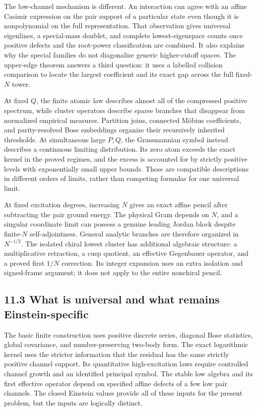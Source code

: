 The low-channel mechanism is different. An interaction can agree with an affine Casimir expression on the pair support of a particular state even though it is nonpolynomial on the full representation. That observation gives universal eigenlines, a special-mass doublet, and complete lowest-eigenspace counts once positive defects and the root-power classification are combined. It also explains why the special families do not diagonalize generic higher-cutoff spaces. The upper-edge theorem answers a third question: it uses a labelled collision comparison to locate the largest coefficient and its exact gap across the full fixed-\(N\) tower.

At fixed \(Q\), the finite atomic law describes almost all of the compressed positive spectrum, while cluster operators describe sparse branches that disappear from normalized empirical measures. Partition joins, connected Möbius coefficients, and parity-resolved Bose embeddings organize their recursively inherited thresholds. At simultaneous large \(P,Q\), the Grassmannian symbol instead describes a continuous limiting distribution. Its zero atom exceeds the exact kernel in the proved regimes, and the excess is accounted for by strictly positive levels with exponentially small upper bounds. These are compatible descriptions in different orders of limits, rather than competing formulas for one universal limit.

At fixed excitation degrees, increasing \(N\) gives an exact affine pencil after subtracting the pair ground energy. The physical Gram depends on \(N\), and a singular coordinate limit can possess a genuine leading Jordan block despite finite-\(N\) self-adjointness. General analytic branches are therefore organized in \(N^{-1/2}\). The isolated chiral lowest cluster has additional algebraic structure: a multiplicative retraction, a cusp quotient, an effective Gegenbauer operator, and a proved first \(1/N\) correction. Its integer expansion uses an extra isolation and signed-frame argument; it does not apply to the entire nonchiral pencil.

\hypertarget{what-is-universal-and-what-remains-einstein-specific}{%
\subsection{11.3 What is universal and what remains Einstein-specific}\label{what-is-universal-and-what-remains-einstein-specific}}

The basic finite construction uses positive discrete series, diagonal Bose statistics, global covariance, and number-preserving two-body form. The exact logarithmic kernel uses the stricter information that the residual has the same strictly positive channel support. Its quantitative high-excitation laws require controlled channel growth and an identified principal symbol. The stable low algebra and its first effective operator depend on specified affine defects of a few low pair channels. The closed Einstein values provide all of these inputs for the present problem, but the inputs are logically distinct.

